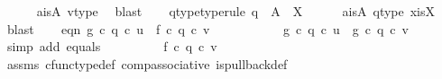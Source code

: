 \begin{isabellebody}
\ \ \ \ \isamarkupfalse%
\ a{\isacharunderscore}{\kern0pt}is{\isacharunderscore}{\kern0pt}A\ v{\isacharunderscore}{\kern0pt}type\ \isamarkupfalse%
\ blast\isanewline
\ \ \isamarkupfalse%
\ q{}{\isacharunderscore}{\kern0pt}type{}{\isacharbrackleft}{\kern0pt}type{\isacharunderscore}{\kern0pt}rule{\isacharbrackright}{\kern0pt}{\isacharcolon}{\kern0pt}\ {\isachardoublequoteopen}q{}\ {\isacharcolon}{\kern0pt}\ A\ {\isasymrightarrow}\ X{\isachardoublequoteclose}\isanewline
\ \ \ \ \isamarkupfalse%
\ a{\isacharunderscore}{\kern0pt}is{\isacharunderscore}{\kern0pt}A\ q{}{\isacharunderscore}{\kern0pt}type\ x{\isacharunderscore}{\kern0pt}is{\isacharunderscore}{\kern0pt}X\ \isamarkupfalse%
\ blast\isanewline
\isanewline
\ \ \isamarkupfalse%
\ eqn{}{\isacharcolon}{\kern0pt}\ {\isachardoublequoteopen}g\ {\isasymcirc}\isactrlsub c\ {\isacharparenleft}{\kern0pt}q{}\ {\isasymcirc}\isactrlsub c\ u{\isacharparenright}{\kern0pt}\ {\isacharequal}{\kern0pt}\ f\ {\isasymcirc}\isactrlsub c\ {\isacharparenleft}{\kern0pt}q{}\ {\isasymcirc}\isactrlsub c\ v{\isacharparenright}{\kern0pt}{\isachardoublequoteclose}\isanewline
\ \ \isamarkupfalse%
\ {\isacharminus}{\kern0pt}\ \isanewline
\ \ \ \ \isamarkupfalse%
\ {\isachardoublequoteopen}g\ {\isasymcirc}\isactrlsub c\ {\isacharparenleft}{\kern0pt}q{}\ {\isasymcirc}\isactrlsub c\ u{\isacharparenright}{\kern0pt}\ {\isacharequal}{\kern0pt}\ g\ {\isasymcirc}\isactrlsub c\ q{}\ {\isasymcirc}\isactrlsub c\ v{\isachardoublequoteclose}\isanewline
\ \ \ \ \ \ \isamarkupfalse%
\ {\isacharparenleft}{\kern0pt}simp\ add{\isacharcolon}{\kern0pt}\ equals{\isacharparenright}{\kern0pt}\isanewline
\ \ \ \ \isamarkupfalse%
\ \isamarkupfalse%
\ {\isachardoublequoteopen}{\isachardot}{\kern0pt}{\isachardot}{\kern0pt}{\isachardot}{\kern0pt}\ {\isacharequal}{\kern0pt}\ f\ {\isasymcirc}\isactrlsub c\ {\isacharparenleft}{\kern0pt}q{}\ {\isasymcirc}\isactrlsub c\ v{\isacharparenright}{\kern0pt}{\isachardoublequoteclose}\isanewline
\ \ \ \ \ \ \isamarkupfalse%
\ assms{\isacharparenleft}{\kern0pt}{}{\isacharparenright}{\kern0pt}\ cfunc{\isacharunderscore}{\kern0pt}type{\isacharunderscore}{\kern0pt}def\ comp{\isacharunderscore}{\kern0pt}associative\ is{\isacharunderscore}{\kern0pt}pullback{\isacharunderscore}{\kern0pt}def\ \isamarkupfalse%

\end{isabellebody}
